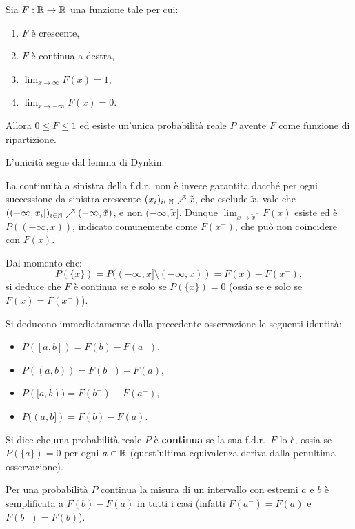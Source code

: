 \begin{multicols*}{2}
\begin{proposition}
    Sia $F : \mathbb{R} \to \mathbb{R}$ una funzione tale per cui:
    \begin{enumerate}[(i.)]
        \item $F$ è crescente,
        \item $F$ è continua a destra,
        \item $\lim_{x \to \infty} F(x) = 1$,
        \item $\lim_{x \to -\infty} F(x) = 0$.
    \end{enumerate}
    Allora $0 \leq F \leq 1$ ed esiste un'unica probabilità reale $P$ avente
    $F$ come funzione di ripartizione. \smallskip


    L'unicità segue dal lemma di Dynkin.
\end{proposition}

\begin{remark}
    La continuità a sinistra della f.d.r.~non è invece garantita dacché per ogni successione da sinistra crescente
    $(x_i)_{i \in \mathbb{N}} \nearrow \tilde{x}$, che esclude $\tilde{x}$,
    vale che $((-\infty, x_i])_{i \in \mathbb{N}} \nearrow (-\infty, \tilde{x})$, e non
    $(-\infty, \tilde{x}]$. Dunque $\lim_{x \to \tilde{x}^-} F(x)$ esiste ed è $P((-\infty, x))$, indicato
    comunemente come $F(x^-)$, che può non coincidere con $F(x)$. \smallskip

    Dal momento che:
    \[
        P(\{x\}) = P((-\infty, x] \setminus (-\infty, x)) = F(x) - F(x^-),
    \]
    si deduce che $F$ è continua se e solo se $P(\{x\}) = 0$ (ossia se e solo se
    $F(x) = F(x^-)$).
\end{remark}

\begin{remark}
    Si deducono immediatamente dalla precedente osservazione le seguenti identità:
    \begin{itemize}
        \item $P([a, b]) = F(b) - F(a^-)$,
        \item $P((a, b)) = F(b^-) - F(a)$,
        \item $P([a, b)) = F(b^-) - F(a^-)$,
        \item $P((a, b]) = F(b) - F(a)$.
    \end{itemize} 
\end{remark}

\begin{definition}[$P$ continua]
    Si dice che una probabilità reale $P$ è \textbf{continua} se
    la sua f.d.r.~$F$ lo è, ossia se $P(\{a\}) = 0$ per ogni $a \in \mathbb{R}$
    (quest'ultima equivalenza deriva dalla penultima osservazione). 
\end{definition}

\begin{remark}
    Per una probabilità $P$ continua la misura di un intervallo con estremi $a$ e $b$ è semplificata
    a $F(b) - F(a)$ in tutti i casi (infatti $F(a^-) = F(a)$ e $F(b^-) = F(b)$).  
\end{remark}

\end{multicols*}